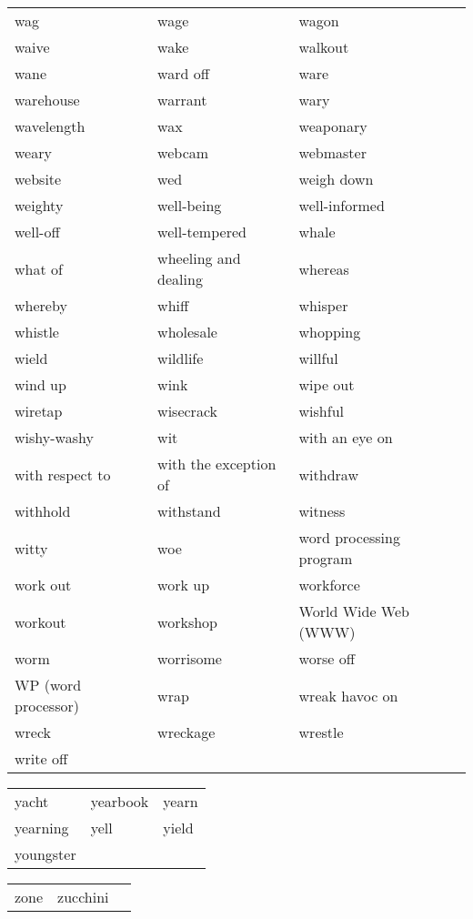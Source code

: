 \documentclass{minimal}
\begin{document}
\begin{longtable}{p{2.7cm}@{\hskip 0.2cm}p{2.7cm}@{\hskip 0.2cm}p{2.7cm}}
wag & wage & wagon \\
waive & wake & walkout \\
wane & ward off & ware \\
warehouse & warrant & wary \\
wavelength & wax & weaponary \\
weary & webcam & webmaster \\
website & wed & weigh down \\
weighty & well-being & well-informed \\
well-off & well-tempered & whale \\
what of & wheeling and dealing & whereas \\
whereby & whiff & whisper \\
whistle & wholesale & whopping \\
wield & wildlife & willful \\
wind up & wink & wipe out \\
wiretap & wisecrack & wishful \\
wishy-washy & wit & with an eye on \\
with respect to & with the exception of & withdraw \\
withhold & withstand & witness \\
witty & woe & word processing program \\
work out & work up & workforce \\
workout & workshop & World Wide Web (WWW) \\
worm & worrisome & worse off \\
WP (word processor) & wrap & wreak havoc on \\
wreck & wreckage & wrestle \\
write off
\end{longtable}

\begin{longtable}{p{2.7cm}@{\hskip 0.2cm}p{2.7cm}@{\hskip 0.2cm}p{2.7cm}}
yacht & yearbook & yearn \\
yearning & yell & yield \\
youngster
\end{longtable}

\begin{longtable}{p{2.7cm}@{\hskip 0.2cm}p{2.7cm}@{\hskip 0.2cm}p{2.7cm}}
zone & zucchini &
\end{longtable}
\end{document}
